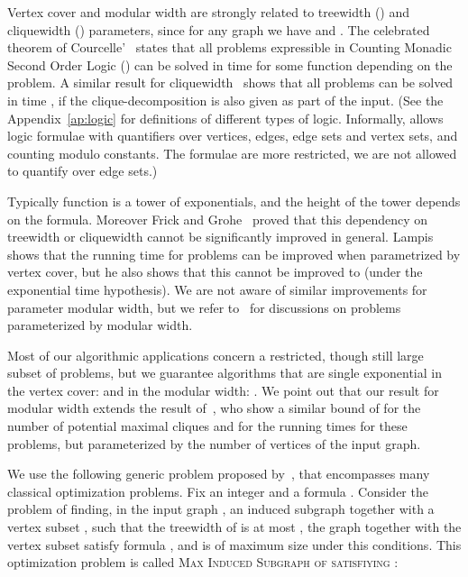 \documentclass{llncs}
\newcommand{\pmc}{potential maximal clique}
\newcommand{\msphit}{\textsc{Max\- Induced\- Subgraph\- of\- \- satisfiying\- }}
\begin{document}
Vertex cover and modular width are strongly related to treewidth () and cliquewidth () parameters, since for any graph  we have  and . The celebrated theorem of Courcelle'~\cite{Courcelle90} states that all problems expressible in Counting Monadic Second Order Logic () can be solved in time  for some function  depending on the problem. A similar result for cliquewidth~\cite{CMR00} shows that all  problems can be solved in time , if the clique-decomposition is also given as part of the input. (See the Appendix~\ref{ap:logic} for definitions of different types of logic. Informally,  allows logic formulae with quantifiers over vertices, edges, edge sets and vertex sets, and counting modulo constants. The  formulae are more restricted, we are not allowed to quantify over edge sets.) 


Typically function  is a tower of exponentials, and the height of the tower depends on the formula. Moreover Frick and Grohe~\cite{FrGr04} proved that this dependency on treewidth or cliquewidth cannot be significantly improved in general. 
Lampis~\cite{Lampis12} shows that the running time for  problems can be improved  when parametrized by vertex cover, but he also shows that this cannot be improved to  (under the exponential time hypothesis). We are not aware of similar improvements for parameter modular width, but we refer to~\cite{GLO13} for discussions on problems parameterized by modular width. 

Most of our algorithmic applications concern a restricted, though still large subset of  problems, but we guarantee algorithms that are single exponential in the vertex cover:  and in the modular width: . We point out that our result for modular width extends the result of~\cite{FoVi10,FoToVi14}, who show a similar bound of  for the number of \pmc s and for the running times for these problems, but parameterized by the number of vertices of the input graph. 


We use the following  generic problem proposed by~\cite{FoToVi14}, that encompasses many classical optimization problems.
Fix an integer  and a  formula . 
Consider the problem of finding, in the input graph , an induced subgraph  together with a vertex subset , such that the treewidth of  is at most , the graph  together with the vertex subset  satisfy formula , and  is of maximum size under this conditions. This optimization problem is called \msphit:


\vspace{-0.2cm}

\vspace{-0.2cm}
\end{document}
